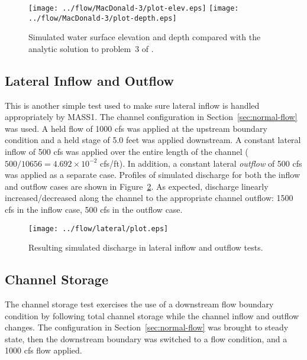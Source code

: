 \documentclass[12pt,dvips,letterpaper]{article}
\begin{document}
\begin{figure}[hbtp]
  \centering
  \texttt{[image: ../flow/MacDonald-3/plot-elev.eps]}
  \texttt{[image: ../flow/MacDonald-3/plot-depth.eps]}  
  \caption{Simulated water surface elevation and depth compared with the
    analytic solution to problem~3 of \cite{macdonald97:_analytic}.}
  \label{fig:macdonald-3-results}
\end{figure}

\subsection{Lateral Inflow and Outflow}
\label{sec:test-lateral}

This is another simple test used to make sure lateral inflow is
handled appropriately by MASS1.  The channel configuration in
Section~\ref{sec:normal-flow} was used. A held flow of 1000 cfs was
applied at the upstream boundary condition and a held stage of 5.0
feet was applied downstream.  A constant lateral inflow of 500 cfs was
applied over the entire length of the channel ($500 \slash 10656 = 4.692
\times 10^{-2}$ cfs/ft).  In addition, a constant lateral
\textit{outflow} of 500 cfs was applied as a separate case.  Profiles
of simulated discharge for both the inflow and outflow cases are shown
in Figure~\ref{fig:test-lateral}.  As expected, discharge linearly
increased/decreased along the channel to the appropriate channel
outflow: 1500 cfs in the inflow case, 500 cfs in the outflow case.

\begin{figure}[htbp]
  \begin{center}
    \texttt{[image: ../flow/lateral/plot.eps]}
    \caption{Resulting simulated discharge in lateral inflow and
      outflow tests.}  
    \label{fig:test-lateral}
  \end{center}
\end{figure}

\subsection{Channel Storage}
\label{sec:test-storage}

The channel storage test exercises the use of a downstream flow
boundary condition by following total channel storage while the
channel inflow and outflow changes.  The configuration in
Section~\ref{sec:normal-flow} was brought to steady state, then the
downstream boundary was switched to a flow condition, and a 1000 cfs
flow applied.  
\end{document}

